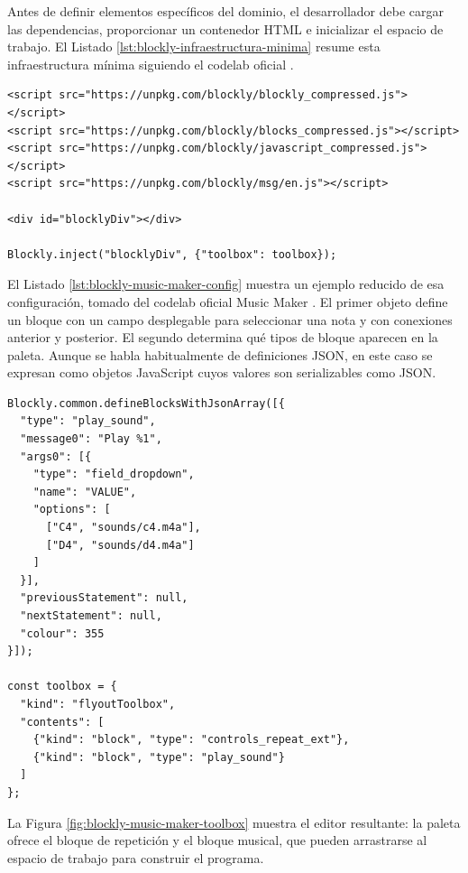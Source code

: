 Antes de definir elementos específicos del dominio, el desarrollador debe
cargar las dependencias, proporcionar un contenedor HTML e inicializar el
espacio de trabajo. El Listado \ref{lst:blockly-infraestructura-minima} resume esta
infraestructura mínima siguiendo el codelab oficial
\cite{blocklyGettingStartedCodelab}.

\begin{lstlisting}[style=tfmhtml, caption={Infraestructura mínima para crear un espacio de trabajo Blockly}, label={lst:blockly-infraestructura-minima}]
<script src="https://unpkg.com/blockly/blockly_compressed.js"></script>
<script src="https://unpkg.com/blockly/blocks_compressed.js"></script>
<script src="https://unpkg.com/blockly/javascript_compressed.js"></script>
<script src="https://unpkg.com/blockly/msg/en.js"></script>

<div id="blocklyDiv"></div>

Blockly.inject("blocklyDiv", {"toolbox": toolbox});
\end{lstlisting}

El Listado \ref{lst:blockly-music-maker-config} muestra un ejemplo reducido de
esa configuración, tomado del codelab oficial Music Maker
\cite{blocklyGettingStartedCodelab}. El primer objeto define un bloque con un
campo desplegable para seleccionar una nota y con conexiones anterior y
posterior. El segundo determina qué tipos de bloque aparecen en la paleta.
Aunque se habla habitualmente de definiciones JSON, en este caso se expresan
como objetos JavaScript cuyos valores son serializables como JSON.

\begin{lstlisting}[style=tfmjavascript, caption={Definición de un bloque y configuración mínima de una paleta en Blockly}, label={lst:blockly-music-maker-config}]
Blockly.common.defineBlocksWithJsonArray([{
  "type": "play_sound",
  "message0": "Play %1",
  "args0": [{
    "type": "field_dropdown",
    "name": "VALUE",
    "options": [
      ["C4", "sounds/c4.m4a"],
      ["D4", "sounds/d4.m4a"]
    ]
  }],
  "previousStatement": null,
  "nextStatement": null,
  "colour": 355
}]);

const toolbox = {
  "kind": "flyoutToolbox",
  "contents": [
    {"kind": "block", "type": "controls_repeat_ext"},
    {"kind": "block", "type": "play_sound"}
  ]
};
\end{lstlisting}

La Figura \ref{fig:blockly-music-maker-toolbox} muestra el editor resultante: la
paleta ofrece el bloque de repetición y el bloque musical, que pueden
arrastrarse al espacio de trabajo para construir el programa.


